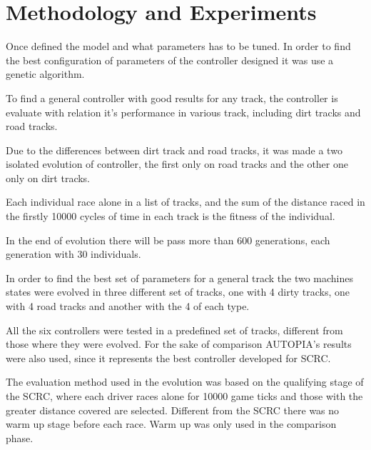 \section{Methodology and Experiments} \label{sec:exp}
	Once defined the model and what parameters has to be tuned. In order to find the best configuration of parameters of the controller designed it was use a genetic algorithm.
	
	To find a general controller with good results for any track, the controller is evaluate with relation it's performance in various track, including dirt tracks and road tracks. 
	
	Due to the differences between dirt track and road tracks, it was made a two isolated evolution of controller, the first only on road tracks and the other one only on dirt tracks.
	
	Each individual race alone in a list of tracks, and the sum of the distance raced in the firstly 10000 cycles of time in each track is the fitness of the individual.
	
	In the end of evolution there will be pass more than 600 generations, each generation with 30 individuals.
	
	In order to find the best set of parameters for a general track the two machines states were evolved in three different set of tracks, one with 4 dirty tracks, one with 4 road tracks and another with the 4 of each type. 
	
	All the six controllers were tested in a predefined set of tracks, different from those where they were evolved. For the sake of comparison AUTOPIA's results were also used, since it represents the best controller developed for SCRC.
	
	
	The evaluation method used in the evolution was based on the qualifying stage of the SCRC, where each driver races alone for 10000 game ticks and those with the greater distance covered are selected. Different from the SCRC there was no warm up stage before each race.
	Warm up was only used in the comparison phase. %
	
	